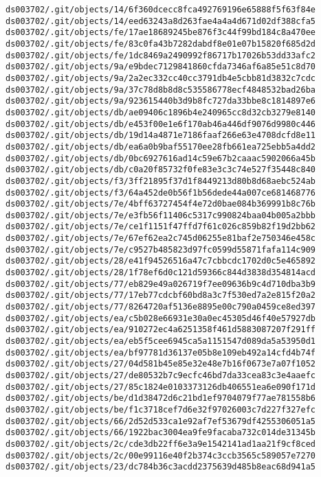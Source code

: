 \documentclass[11pt]{article}
\begin{document}
\begin{Verbatim}[commandchars=\\\{\}]
ds003702/.git/objects/14/6f360dcecc8fca492769196e65888f5f63f84e
ds003702/.git/objects/14/eed63243a8d263fae4a4a4d671d02df388cfa5
ds003702/.git/objects/fe/17ae18689245be876f3c44f99bd184c8a470ee
ds003702/.git/objects/fe/83c0fa43b7282dabdf8e01e07b15820f685d2d
ds003702/.git/objects/fe/1dc8469a2490992f86717b17026b53dd33afc2
ds003702/.git/objects/9a/e9bdec7129841860cfda7346af6a85e51c8d70
ds003702/.git/objects/9a/2a2ec332cc40cc3791db4e5cbb81d3832c7cdc
ds003702/.git/objects/9a/37c78d8b8d8c535586778ecf4848532bad26ba
ds003702/.git/objects/9a/923615440b3d9b8fc727da33bbe8c1814897e6
ds003702/.git/objects/db/ae09406c1896b4e240965cc8d32cb3279e8140
ds003702/.git/objects/db/e453f00e1e6f170ab46a446df9076d9980c446
ds003702/.git/objects/db/19d14a4871e7186faaf266e63e4708dcfd8e11
ds003702/.git/objects/db/ea6a0b9baf55170ee28fb661ea725ebb5a4dd2
ds003702/.git/objects/db/0bc6927616ad14c59e67b2caaac5902066a45b
ds003702/.git/objects/db/c0a20f85732f0fe83e3c3c74e527f35448c840
ds003702/.git/objects/f3/3ff21895f37d1f8449213d80b8d68aebc524ab
ds003702/.git/objects/f3/64a452de0b56f1b56dede44a007ce681468776
ds003702/.git/objects/7e/4bff63727454f4e72d0bae084b369991b8c76b
ds003702/.git/objects/7e/e3fb56f11406c5317c990824baa04b005a2bbb
ds003702/.git/objects/7e/ce1f1151f47ffd7f61c026c859b82f19d2bb62
ds003702/.git/objects/7e/67ef62ea2c745d06255e81baf2e750346e458c
ds003702/.git/objects/7e/c9527b485823d97fc0599d55871fafa114c909
ds003702/.git/objects/28/e41f94526516a47c7cbbcdc1702d0c5e465892
ds003702/.git/objects/28/1f78ef6d0c121d59366c844d3838d354814acd
ds003702/.git/objects/77/eb829e49a026719f7ee09636b9c4d710dba3b9
ds003702/.git/objects/77/17eb77cdcbf60bd8a3c7f530ed7a2e815f20a2
ds003702/.git/objects/77/8264720af5136e8895e00c790a0459ce8ed397
ds003702/.git/objects/ea/c5b028e66931e30a0ec45305d46f40e57927db
ds003702/.git/objects/ea/910272ec4a6251358f461d5883087207f291ff
ds003702/.git/objects/ea/eb5f5cee6945ca5a1151547d089da5a53950d1
ds003702/.git/objects/ea/bf97781d36137e05b8e109eb492a14cfd4b74f
ds003702/.git/objects/27/04d581b45e85e32e48e7b16f0673e7a07f1052
ds003702/.git/objects/27/de80532b7c9ecfc46bd7da33cea83c3e4aaefc
ds003702/.git/objects/27/85c1824e0103373126db406551ea6e090f171d
ds003702/.git/objects/be/d1d38472d6c21bd1ef9704079f77ae781558b6
ds003702/.git/objects/be/f1c3718cef7d6e32f97026003c7d227f327efc
ds003702/.git/objects/66/2d52d533ca1e92af7ef53679df4255306051a5
ds003702/.git/objects/66/1922bac3004ea9fe9facaba732c014de31345b
ds003702/.git/objects/2c/cde3db22ff6e3a9e1542141ad1aa21f9cf8ced
ds003702/.git/objects/2c/00e99116e40f2b374c3ccb3565c589057e7270
ds003702/.git/objects/23/dc784b36c3acdd2375639d485b8eac68d941a5

\end{Verbatim}
\end{document}
